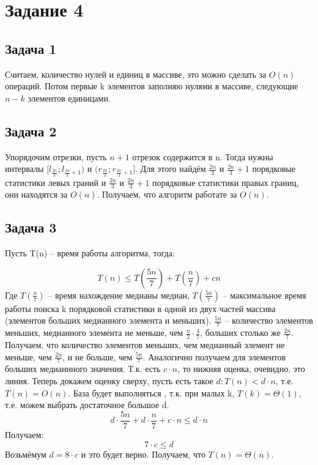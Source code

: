 \documentclass[a4paper,14pt]{article} %
\begin{document}

\section{Задание 4}

\subsection{Задача 1}
Считаем, количество нулей и единиц в массиве, это можно сделать за $O(n)$ операций. Потом первые k элементов заполняю нулями в массиве, следующие $n-k$ элементов единицами.


\subsection{Задача 2}
Упорядочим отрезки, пусть $n+1$ отрезок содержится в n. Тогда нужны интервалы $[l_{\frac{2n}{3}}; l_{\frac{2n}{3}+1})$ и $(r_{\frac{2n}{3}}; r_{\frac{2n}{3}+1}]$. 
Для этого найдём $\frac{2n}{3}$ и $\frac{2n}{3}+1$ порядковые статистики левых граний и $\frac{2n}{3}$ и $\frac{2n}{3}+1$ порядковые статистики правых границ, они находятся за $O(n)$. Получаем, что алгоритм работате за $O(n)$.

\subsection{Задача 3}
Пусть T(n) -- время работы алгоритма, тогда:

\begin{equation*}
	T\left(n\right) \leq T\left(\frac{5n}{7}\right) + T\left(\frac{n}{7}\right) + cn
\end{equation*}
Где $T\left(\frac{n}{7}\right)$ -- время нахождение медианы медиан, $T\left(\frac{5n}{7}\right)$ -- максимальное время работы поиска k порядковой статистики в одной из двух частей массива
(элементов больших медианного элемента и меньших). $\frac{5n}{7}$ -- количество элементов меньших, медианного элемента не меньше, чем $\frac{n}{2} \cdot \frac{4}{7}$, больших столько же $\frac{2n}{7}$. Получаем, что количество элементов меньших, чем медианный элемент не меньше, чем $\frac{2n}{7}$, и не больше, чем $\frac{5n}{7}$. 
Аналогично получаем для элементов больших медианнного значения. Т.к. есть $c \cdot n$, то нижняя оценка, очевидно, это линия. Теперь докажем оценку сверху, пусть есть такое $d : T(n) < d \cdot n$, т.е. $T(n) = O(n)$.
База будет выполняться , т.к. при малых k, $T(k) = \Theta(1)$, т.е. можем выбрать достаточное большое d.
\begin{equation*}
	d \cdot \frac{5n}{7} + d \cdot \frac{n}{7} + c \cdot n \leq d \cdot n
\end{equation*}
Получаем:
\begin{equation*}
	7 \cdot c \leq d
\end{equation*}
Возьмёмум $d = 8 \cdot c$ и это будет верно. Получаем, что $T(n) = \Theta(n)$.
\end{document}
